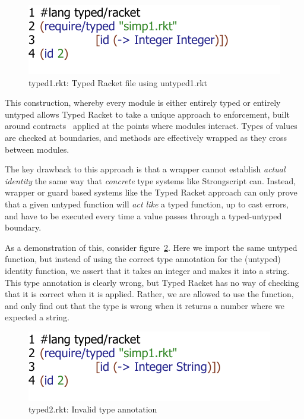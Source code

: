 \documentclass[a4paper,USenglish]{tex/lipics-v2016}
\begin{document}
\begin{figure}
\includegraphics{figures/typed-rkt1.pdf}
\caption{typed1.rkt: Typed Racket file using untyped1.rkt}
\label{fig:t1r}
\end{figure}

This construction, whereby every module is either entirely typed or entirely
untyped allows Typed Racket to take a unique approach to enforcement, built
around contracts~\cite{tf-popl08} applied at the points where modules
interact. Types of values are checked at boundaries, and methods are
effectively wrapped as they cross between modules.

The key drawback to this approach is that a wrapper cannot establish
\emph{actual identity} the same way that \emph{concrete} type systems like
Strongscript can. Instead, wrapper or guard based systems like the Typed
Racket approach can only prove that a given untyped function will \emph{act
  like} a typed function, up to cast errors, and have to be executed every
time a value passes through a typed-untyped boundary.

As a demonstration of this, consider figure~\ref{fig:tr2}. Here we import
the same untyped function, but instead of using the correct type annotation
for the (untyped) identity function, we assert that it takes an integer and
makes it into a string. This type annotation is clearly wrong, but Typed
Racket has no way of checking that it is correct when it is applied. Rather,
we are allowed to use the  function, and only find out that the type
is wrong when it returns a number where we expected a string.

\begin{figure}[h]
\includegraphics{figures/typed-rkt2.pdf}
\caption{typed2.rkt: Invalid type annotation}
\label{fig:tr2}
\end{figure}
\end{document}
